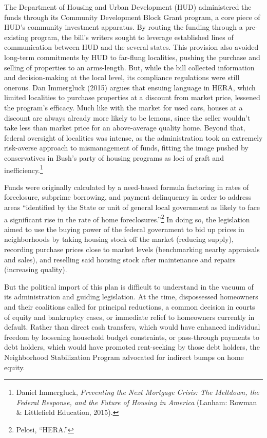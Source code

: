 \documentclass[12pt,oneside]{psthesis}
\begin{document}
The Department of Housing and Urban Development (HUD) administered the funds through its Community Development Block Grant program, a core piece of HUD's community investment apparatus.
By routing the funding through a pre-existing program, the bill's writers sought to leverage established lines of communication between HUD and the several states.
This provision also avoided long-term commitments by HUD to far-flung localities, pushing the purchase and selling of properties to an arms-length.
But, while the bill collected information and decision-making at the local level, its compliance regulations were still onerous.
Dan Immergluck (2015) argues that ensuing language in HERA, which limited localities to purchase properties at a discount from market price, lessened the program's efficacy.
Much like with the market for used cars, houses at a discount are always already more likely to be lemons, since the seller wouldn't take less than market price for an above-average quality home.
Beyond that, federal oversight of localities was intense, as the administration took an extremely risk-averse approach to mismanagement of funds, fitting the image pushed by conservatives in Bush's party of housing programs as loci of graft and inefficiency.\footnote{Daniel Immergluck, \emph{Preventing the Next Mortgage Crisis: The Meltdown, the Federal Response, and the Future of Housing in America} (Lanham: Rowman \& Littlefield Education, 2015).}

Funds were originally calculated by a need-based formula factoring in rates of foreclosure, subprime borrowing, and payment delinquency in order to address areas ``identified by the State or unit of general local government as likely to face a significant rise in the rate of home foreclosures.''\footnote{Pelosi, ``HERA.''}
In doing so, the legislation aimed to use the buying power of the federal government to bid up prices in neighborhoods by taking housing stock off the market (reducing supply), recording purchase prices close to market levels (benchmarking nearby appraisals and sales), and reselling said housing stock after maintenance and repairs (increasing quality).

But the political import of this plan is difficult to understand in the vacuum of its administration and guiding legislation.
At the time, dispossessed homeowners and their coalitions called for principal reductions, a common decision in courts of equity and bankruptcy cases, or immediate relief to homeowners currently in default.
Rather than direct cash transfers, which would have enhanced individual freedom by loosening household budget constraints, or pass-through payments to debt holders, which would have promoted rent-seeking by those debt holders, the Neighborhood Stabilization Program advocated for indirect bumps on home equity.
\end{document}
